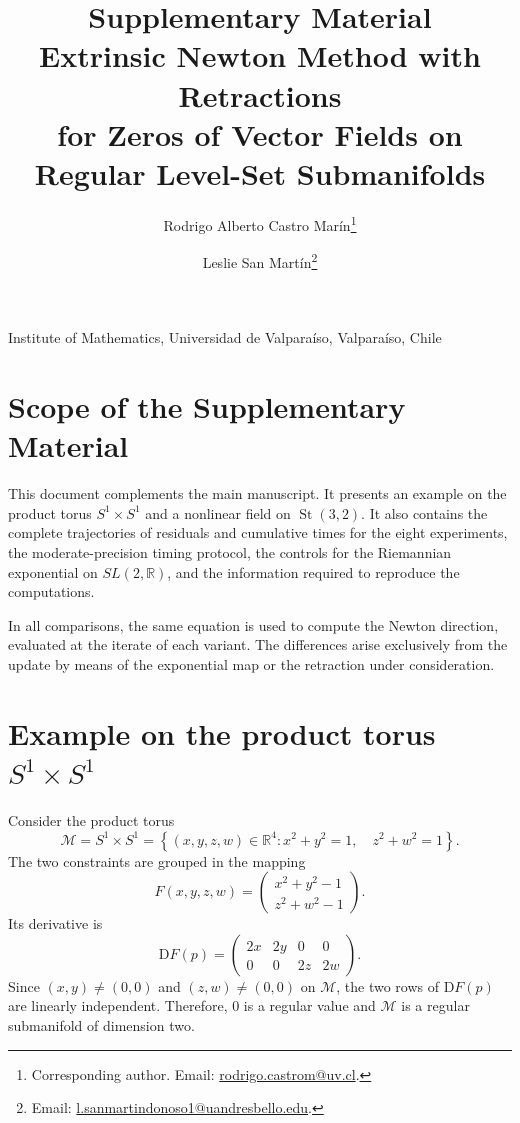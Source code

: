 \documentclass[11pt]{article}
\title{Supplementary Material\\
Extrinsic Newton Method with Retractions\\
for Zeros of Vector Fields on Regular Level-Set Submanifolds}
\author{Rodrigo Alberto Castro Mar\'in\thanks{Corresponding author. Email: \href{mailto:rodrigo.castrom@uv.cl}{rodrigo.castrom@uv.cl}.}
\and Leslie San Mart\'in\thanks{Email: \href{mailto:l.sanmartindonoso1@uandresbello.edu}{l.sanmartindonoso1@uandresbello.edu}.}}
\date{}
\newcommand{\R}{\mathbb{R}}
\newcommand{\M}{\mathcal{M}}
\newcommand{\D}{\mathrm{D}}
\begin{document}
\maketitle
\begin{center}
\small Institute of Mathematics, Universidad de Valpara\'iso, Valpara\'iso, Chile
\end{center}

\section*{Scope of the Supplementary Material}
This document complements the main manuscript. It presents an example on
the product torus $S^1\times S^1$ and a nonlinear field on
$\operatorname{St}(3,2)$. It also contains the complete trajectories of
residuals and cumulative times for the eight experiments, the moderate-precision
timing protocol, the controls for the Riemannian exponential on
$SL(2,\R)$, and the information required to reproduce the computations.

In all comparisons, the same equation is used to compute the Newton
direction, evaluated at the iterate of each variant. The differences arise
exclusively from the update by means of the exponential map or the retraction
under consideration.

\section[Example on the product torus]{Example on the product torus $S^1\times S^1$}
\label{sec:product_torus}

Consider the product torus
\begin{equation}\label{eq:product_torus}
    \M
    =
    S^1\times S^1
    =
    \left\{
        (x,y,z,w)\in\R^4:
        x^2+y^2=1,\quad z^2+w^2=1
    \right\}.
\end{equation}
The two constraints are grouped in the mapping
\begin{equation}\label{eq:F_product_torus}
    F(x,y,z,w)
    =
    \begin{pmatrix}
        x^2+y^2-1\\
        z^2+w^2-1
    \end{pmatrix}.
\end{equation}
Its derivative is
\begin{equation}\label{eq:DF_product_torus}
    \D F(p)
    =
    \begin{pmatrix}
        2x&2y&0&0\\
        0&0&2z&2w
    \end{pmatrix}.
\end{equation}
Since $(x,y)\neq(0,0)$ and $(z,w)\neq(0,0)$ on $\M$, the two rows of
$\D F(p)$ are linearly independent. Therefore, $0$ is a regular value and
$\M$ is a regular submanifold of dimension two.
\end{document}
